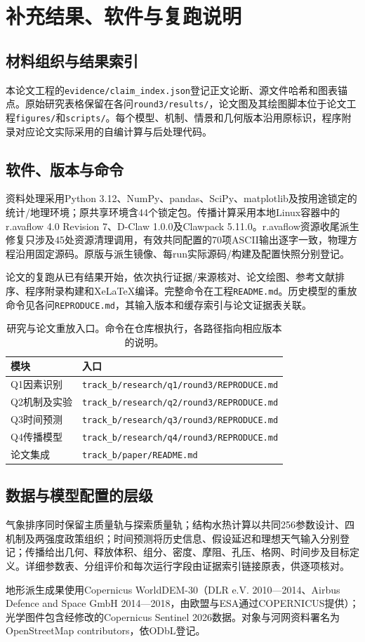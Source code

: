 \section{补充结果、软件与复跑说明}\label{app:supplement}
\subsection{材料组织与结果索引}
本论文工程的\texttt{evidence/claim\_index.json}登记正文论断、源文件哈希和图表锚点。原始研究表格保留在各问\texttt{round3/results/}，论文图及其绘图脚本位于论文工程\texttt{figures/}和\texttt{scripts/}。每个模型、机制、情景和几何版本沿用原标识，程序附录对应论文实际采用的自编计算与后处理代码。

\subsection{软件、版本与命令}
资料处理采用Python 3.12、NumPy、pandas、SciPy、matplotlib及按用途锁定的统计/地理环境；原共享环境含44个锁定包。传播计算采用本地Linux容器中的r.avaflow 4.0 Revision 7、D-Claw 1.0.0及Clawpack 5.11.0。r.avaflow资源收尾派生修复只涉及45处资源清理调用，有效共同配置的70项ASCII输出逐字一致，物理方程沿用固定源码。原版与派生镜像、每run实际源码/构建及配置快照分别登记。

论文的复跑从已有结果开始，依次执行证据/来源核对、论文绘图、参考文献排序、程序附录构建和XeLaTeX编译。完整命令在工程\texttt{README.md}。历史模型的重放命令见各问\texttt{REPRODUCE.md}，其输入版本和缓存索引与论文证据表关联。

\begin{table}[htbp]\centering\small
\caption{研究与论文重放入口。命令在仓库根执行，各路径指向相应版本的说明。}
\begin{tabularx}{\linewidth}{p{2.3cm}Y}
\toprule
模块 & 入口\\\midrule
Q1因素识别 & \texttt{track\_b/research/q1/round3/REPRODUCE.md}\\
Q2机制及实验 & \texttt{track\_b/research/q2/round3/REPRODUCE.md}\\
Q3时间预测 & \texttt{track\_b/research/q3/round3/REPRODUCE.md}\\
Q4传播模型 & \texttt{track\_b/research/q4/round3/REPRODUCE.md}\\
论文集成 & \texttt{track\_b/paper/README.md}\\\bottomrule
\end{tabularx}\end{table}

\subsection{数据与模型配置的层级}
气象排序同时保留主质量轨与探索质量轨；结构水热计算以共同256参数设计、四机制及两强度政策组织；时间预测将历史信息、假设延迟和理想天气输入分别登记；传播给出几何、释放体积、组分、密度、摩阻、孔压、格网、时间步及目标定义。详细参数表、分组评价和每次运行字段由证据索引链接原表，供逐项核对。



地形派生成果使用Copernicus WorldDEM-30（DLR e.V. 2010—2014、Airbus Defence and Space GmbH 2014—2018，由欧盟与ESA通过COPERNICUS提供）；光学图件包含经修改的Copernicus Sentinel 2026数据。对象与河网资料署名为OpenStreetMap contributors，依ODbL登记。
